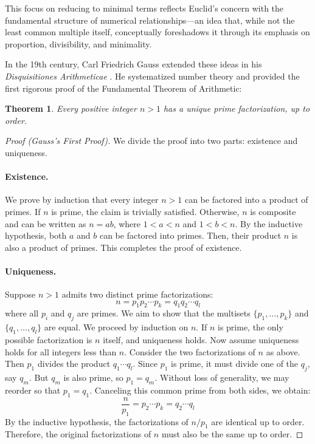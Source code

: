 \documentclass[11pt]{article}
\theoremstyle{plain}
\newtheorem{theorem}{Theorem}
\begin{document}
This focus on reducing to minimal terms reflects Euclid’s concern with the fundamental structure of numerical relationships—an idea that, while not the least common multiple itself, conceptually foreshadows it through its emphasis on proportion, divisibility, and minimality.

\vspace{2mm}

In the 19th century, Carl Friedrich Gauss extended these ideas in his \emph{Disquisitiones Arithmeticae} \cite{Gauss}. He systematized number theory and provided the first rigorous proof of the Fundamental Theorem of Arithmetic: 
\begin{theorem}
    Every positive integer $n > 1$ has a unique prime factorization, up to order.
\end{theorem}

\begin{proof}[Proof (Gauss's First Proof)]
    
We divide the proof into two parts: existence and uniqueness.
\paragraph{Existence.} We prove by induction that every integer $n > 1$ can be factored into a product of primes. If $n$ is prime, the claim is trivially satisfied. Otherwise, $n$ is composite and can be written as $n = ab$, where $1 < a < n$ and $1 < b < n$. By the inductive hypothesis, both $a$ and $b$ can be factored into primes. Then, their product $n$ is also a product of primes. This completes the proof of existence.
\paragraph{Uniqueness.} Suppose $n > 1$ admits two distinct prime factorizations:
\[
n = p_1 p_2 \cdots p_k = q_1 q_2 \cdots q_l
\]
where all $p_i$ and $q_j$ are primes. We aim to show that the multisets $\{p_1, \ldots, p_k\}$ and $\{q_1, \ldots, q_l\}$ are equal. We proceed by induction on $n$. If $n$ is prime, the only possible factorization is $n$ itself, and uniqueness holds. Now assume uniqueness holds for all integers less than $n$. Consider the two factorizations of $n$ as above. Then $p_1$ divides the product $q_1 \cdots q_l$. Since $p_1$ is prime, it must divide one of the $q_j$, say $q_m$. But $q_m$ is also prime, so $p_1 = q_m$. Without loss of generality, we may reorder so that $p_1 = q_1$. Canceling this common prime from both sides, we obtain:
\[
\frac{n}{p_1} = p_2 \cdots p_k = q_2 \cdots q_l
\]
By the inductive hypothesis, the factorizations of $n/p_1$ are identical up to order. Therefore, the original factorizations of $n$ must also be the same up to order.
\end{proof}
\end{document}
